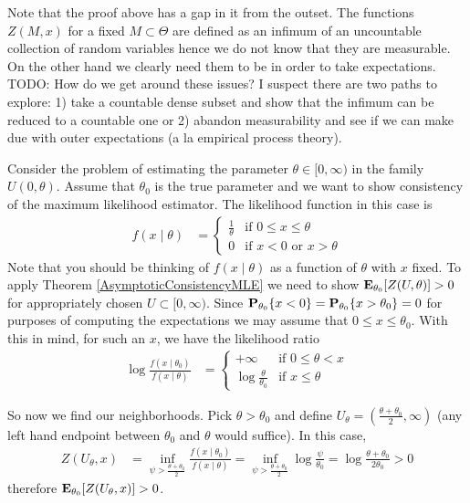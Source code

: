 Note that the proof above has a gap in it from the outset.  The
functions $Z(M, x)$ for a fixed $M \subset \Theta$ are defined as an
infimum of an uncountable collection of random variables hence we do
not know that they are measurable.  On the other hand we clearly need
them to be in order to take expectations.  TODO:  How do we get around
these issues?  I suspect there are two paths to explore: 1) take a
countable dense subset and show that the infimum can be reduced to a
countable one or 2) abandon measurability and see if we can make due
with outer expectations (a la empirical process theory).

\begin{examp}
Consider the problem of estimating the parameter $\theta \in [0,
\infty)$ in the family $U(0, \theta)$.  Assume that $\theta_0$ is the
true parameter and we want to show consistency of the maximum
likelihood estimator.  The likelihood function in
this case is 
\begin{align*}
f(x \mid \theta) &= \begin{cases}
\frac{1}{\theta} & \text{if $0 \leq x \leq \theta$} \\
0 & \text{if $x < 0$ or $x > \theta$}
\end{cases}
\end{align*}
Note that you should be thinking of $f(x \mid \theta)$ as a function
of $\theta$ with $x$ fixed.  To apply Theorem
\ref{AsymptoticConsistencyMLE}
we need to show $\sexpectation{Z(U, \theta)}{\theta_0} > 0$ for
appropriately chosen $U \subset [0, \infty)$.  Since $\sprobability{x <
  0}{\theta_0} = \sprobability{x > \theta_0}{\theta_0} = 0$ for
purposes of computing the expectations we may assume that $0 \leq x
\leq \theta_0$.  With this in mind, for such an $x$, we have the likelihood ratio
\begin{align*}
\log \frac{f(x \mid \theta_0)}{f (x \mid \theta)} &= \begin{cases}
+\infty & \text{if $0 \leq \theta < x$} \\
\log \frac{\theta}{\theta_0} & \text{if $x \leq \theta$} 
\end{cases}
\end{align*}

So now we find our neighborhoods.  Pick $\theta > \theta_0$ and define
$U_\theta = (\frac{\theta + \theta_0}{2}, \infty)$ (any left hand
endpoint between $\theta_0$ and $\theta$ would suffice).  In this
case,
\begin{align*}
Z(U_\theta, x) &= \inf_{\psi > \frac{\theta + \theta_0}{2}} \frac{f(x
  \mid \theta_0)}{f(x \mid \theta)} = 
\inf_{\psi > \frac{\theta +    \theta_0}{2}} \log \frac{\psi}{\theta_0} =
\log \frac{\theta + \theta_0}{2 \theta_0} > 0
\end{align*}
therefore $\sexpectation{Z(U_\theta, x)}{\theta_0} > 0$.


\end{examp}
